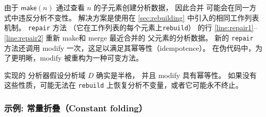 由于 $\textsf{make}(n)$ 通过查看 $n$ 的子元素创建分析数据，
  因此合并 \eclasses 可能会在同一方式中违反分析不变性。
解决方案是使用在 \autoref{sec:rebuilding} 中引入的相同工作列表机制。
\texttt{repair} 方法 （它在工作列表的每个元素上\texttt{rebuild}） 
  的行 \ref{line:repair1}--\ref{line:repair2} 
  重新 \textsf{make}和 \textsf{merge} 最近合并的 \eclasses 父元素的分析数据。
新的 \texttt{repair} 方法还调用 \textsf{modify} 一次，这足以满足其幂等性（idempotence）。
在伪代码中，为了更明晰，\textsf{modify} 被重构为一种可变方法。


\Egg 实现的 \eclass 分析器假设分析域 $D$ 确实是半格，
  并且 \textsf{modify} 具有幂等性。
如果没有这些性质，\egg 可能无法在 \texttt{rebuild} 上恢复分析不变量，或者它可能永不终止。

\subsubsection{示例: 常量折叠（Constant folding）}


